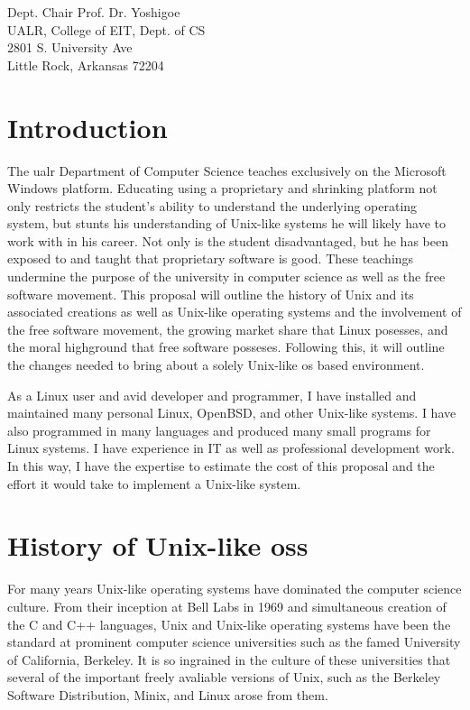\documentclass{letter}
\begin{document}
\begin{letter}{
    Dept. Chair Prof. Dr. Yoshigoe \\
    UALR, College of EIT, Dept. of CS \\
    2801 S. University Ave \\
    Little Rock, Arkansas 72204
  }
    \section{Introduction}

    The \gls{ualr} Department of Computer Science teaches exclusively on the Microsoft Windows platform. Educating using a proprietary and shrinking platform not only restricts the student's ability to understand the underlying operating system, but stunts his understanding of Unix-like systems he will likely have to work with in his career. Not only is the student disadvantaged, but he has been exposed to and taught that proprietary software is good. These teachings undermine the purpose of the university in computer science as well as the free software movement. This proposal will outline the history of Unix and its associated creations as well as Unix-like operating systems and the involvement of the free software movement, the growing market share that Linux posesses, and the moral highground that free software posseses. Following this, it will outline the changes needed to bring about a solely Unix-like \gls{os} based environment.

    As a Linux user and avid developer and programmer, I have installed and maintained many personal Linux, OpenBSD, and other Unix-like systems. I have also programmed in many languages and produced many small programs for Linux systems. I have experience in IT as well as professional development work. In this way, I have the expertise to estimate the cost of this proposal and the effort it would take to implement a Unix-like system.

    \section{History of Unix-like \glspl{os}}

    For many years Unix-like operating systems have dominated the computer science culture. From their inception at Bell Labs in 1969 and simultaneous creation of the C and C++ languages, Unix and Unix-like operating systems have been the standard at prominent computer science universities such as the famed University of California, Berkeley. It is so ingrained in the culture of these universities that several of the important freely avaliable versions of Unix, such as the Berkeley Software Distribution, Minix, and Linux arose from them.


\end{letter}
\end{document}
